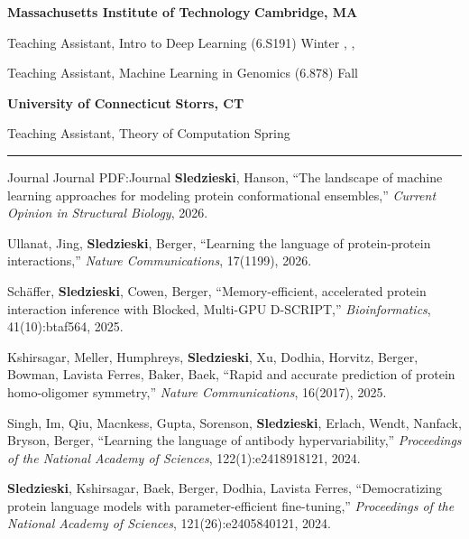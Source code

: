 \documentclass[letterpaper,MMMyyyy,nonstopmode]{simpleresumecv}
\begin{document}
\begin{Body}
\Entry
{\textbf{Massachusetts Institute of Technology}}
\hfill \textbf{Cambridge, MA}

\Gap
\Item Teaching Assistant, Intro to Deep Learning (6.S191)
\hfill
Winter , , 

\Gap
\Item Teaching Assistant, Machine Learning in Genomics (6.878)
\hfill
Fall 

\BigGap
\Entry
{\textbf{University of Connecticut}}
\hfill \textbf{Storrs, CT}

\Gap
\Item Teaching Assistant, Theory of Computation
\hfill
Spring 


\BigGap
\hrule
\Section
{Journal}
{Journal}
{PDF:Journal}
\Gap
\NumberedItem{[12]}
{{\textbf{Sledzieski}, Hanson}, 
``The landscape of machine learning approaches for modeling protein conformational ensembles,'' 
\textit{Current Opinion in Structural Biology}, 2026.
}

\Gap
\NumberedItem{[11]}
{{Ullanat, Jing, \textbf{Sledzieski}, Berger}, 
``Learning the language of protein-protein interactions,'' 
\textit{Nature Communications}, 17(1199), 2026.
}

\Gap
\NumberedItem{[10]}
{{Schäffer, \textbf{Sledzieski}, Cowen, Berger}, 
``Memory-efficient, accelerated protein interaction inference with Blocked, Multi-GPU D-SCRIPT,'' 
\textit{Bioinformatics}, 41(10):btaf564, 2025.
}

\Gap
\NumberedItem{[9]}
{{Kshirsagar, Meller, Humphreys, \textbf{Sledzieski}, Xu, Dodhia, Horvitz, Berger, Bowman, Lavista Ferres, Baker, Baek}, 
``Rapid and accurate prediction of protein homo-oligomer symmetry,'' 
\textit{Nature Communications}, 16(2017), 2025.
}

\Gap
\NumberedItem{[8]}
{{Singh, Im, Qiu, Macnkess, Gupta, Sorenson, \textbf{Sledzieski}, Erlach, Wendt, Nanfack, Bryson, Berger}, 
``Learning the language of antibody hypervariability,'' 
\textit{Proceedings of the National Academy of Sciences}, 122(1):e2418918121, 2024.
}

\Gap
\NumberedItem{[7]}
{{\textbf{Sledzieski}, Kshirsagar, Baek, Berger, Dodhia, Lavista Ferres}, 
``Democratizing protein language models with parameter-efficient fine-tuning,'' 
\textit{Proceedings of the National Academy of Sciences}, 121(26):e2405840121, 2024.
}


\end{Body}
\end{document}
